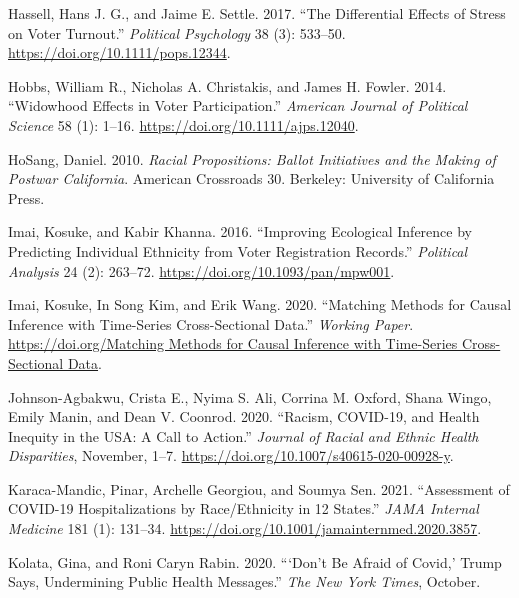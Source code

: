 \documentclass[
  12pt,
]{article}
\newlength{\cslhangindent}
\newlength{\cslentryspacingunit} %
\newenvironment{CSLReferences}[2] %
 {%
  \setlength{\parindent}{0pt}
  \ifodd #1
  \let\oldpar\par
  \def\par{\hangindent=\cslhangindent\oldpar}
  \fi
  \setlength{\parskip}{#2\cslentryspacingunit}
 }%
 {}
\begin{document}
\begin{CSLReferences}{1}{0}
\leavevmode{}%
Hassell, Hans J. G., and Jaime E. Settle. 2017. {``The {Differential Effects} of {Stress} on {Voter Turnout}.''} \emph{Political Psychology} 38 (3): 533--50. \url{https://doi.org/10.1111/pops.12344}.

\leavevmode{}%
Hobbs, William R., Nicholas A. Christakis, and James H. Fowler. 2014. {``Widowhood {Effects} in {Voter Participation}.''} \emph{American Journal of Political Science} 58 (1): 1--16. \url{https://doi.org/10.1111/ajps.12040}.

\leavevmode{}%
HoSang, Daniel. 2010. \emph{Racial Propositions: Ballot {Initiatives} and the Making of Postwar {California}}. American Crossroads 30. {Berkeley}: {University of California Press}.

\leavevmode{}%
Imai, Kosuke, and Kabir Khanna. 2016. {``Improving {Ecological Inference} by {Predicting Individual Ethnicity} from {Voter Registration Records}.''} \emph{Political Analysis} 24 (2): 263--72. \url{https://doi.org/10.1093/pan/mpw001}.

\leavevmode{}%
Imai, Kosuke, In Song Kim, and Erik Wang. 2020. {``Matching {Methods} for {Causal Inference} with {Time-Series Cross-Sectional Data}.''} \emph{Working Paper}. \href{https://doi.org/Matching\%20Methods\%20for\%20Causal\%20Inference\%20with\%20Time-Series\%20Cross-Sectional\%20Data}{https://doi.org/Matching Methods for Causal Inference with Time-Series Cross-Sectional Data}.

\leavevmode{}%
Johnson-Agbakwu, Crista E., Nyima S. Ali, Corrina M. Oxford, Shana Wingo, Emily Manin, and Dean V. Coonrod. 2020. {``Racism, {COVID-19}, and {Health Inequity} in the {USA}: A {Call} to {Action}.''} \emph{Journal of Racial and Ethnic Health Disparities}, November, 1--7. \url{https://doi.org/10.1007/s40615-020-00928-y}.

\leavevmode{}%
Karaca-Mandic, Pinar, Archelle Georgiou, and Soumya Sen. 2021. {``Assessment of {COVID-19 Hospitalizations} by {Race}/{Ethnicity} in 12 {States}.''} \emph{JAMA Internal Medicine} 181 (1): 131--34. \url{https://doi.org/10.1001/jamainternmed.2020.3857}.

\leavevmode{}%
Kolata, Gina, and Roni Caryn Rabin. 2020. {``{`{Don}'t {Be Afraid} of {Covid},'} {Trump Says}, {Undermining Public Health Messages}.''} \emph{The New York Times}, October.


\end{CSLReferences}
\end{document}
